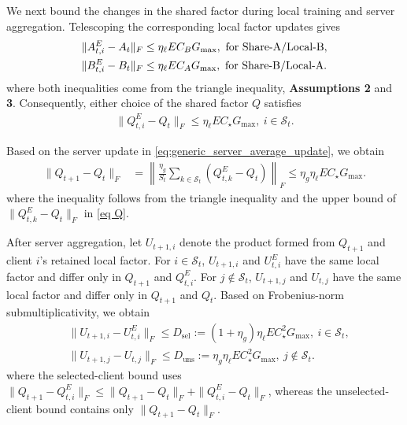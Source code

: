 \documentclass[lettersize,journal]{IEEEtran}
\begin{document}
	We next bound the changes in the shared factor during local training and server aggregation.
	Telescoping the corresponding local factor updates gives
	\begin{align}
		\|A_{t,i}^{E}-A_t\|_F
		&\le \eta_{\ell}EC_BG_{\max},
		\ \text{for Share-A/Local-B},
		\notag\\
		\|B_{t,i}^{E}-B_t\|_F
		&\le \eta_{\ell}EC_AG_{\max},
		\ \text{for Share-B/Local-A}.
	\end{align}
	where both inequalities come from the triangle inequality,
	\textbf{Assumptions 2} and \textbf{3}. Consequently, either choice of the
	shared factor $Q$ satisfies
	\begin{align} \label{eq Q}
		\|Q_{t,i}^{E}-Q_t\|_F
		\le
		\eta_{\ell}EC_\star G_{\max},
		\ i\in\mathcal{S}_t.
	\end{align}
	
	Based on the server update in
	\eqref{eq:generic_server_average_update}, we obtain
	\begin{align}
		\|Q_{t+1}\!-\!Q_t\|_F
		&\!=\!
		\left\|
		\frac{\eta_g}{S_t}\!
		\sum_{k\in\mathcal{S}_t}\!(Q_{t,k}^{E}\!-\!Q_t)\!
		\right\|_F
		\!\!\leq\!\! \eta_g\eta_{\ell}EC_\star G_{\max}.
	\end{align}
	where the inequality follows from the triangle inequality and the
	upper bound of $\|Q_{t,k}^{E}-Q_t\|_F$ in \eqref{eq Q}.
	
	After server aggregation, let $U_{t+1,i}$ denote the product formed from $Q_{t+1}$ and client $i$'s retained local factor. For $i\in\mathcal{S}_t$, $U_{t+1,i}$ and $U_{t,i}^{E}$ have the same local factor and differ only in $Q_{t+1}$ and $Q_{t,i}^{E}$. For $j\notin\mathcal{S}_t$, $U_{t+1,j}$ and $U_{t,j}$ have the same local factor and differ only in $Q_{t+1}$ and $Q_t$. Based on Frobenius-norm submultiplicativity, we obtain
	\begin{align}
		&\|U_{t+1,i}\!-\!U_{t,i}^{E}\|_F
		\!\le\!
		D_{\mathrm{sel}}
		:=\!(1\!+\!\eta_g)\eta_{\ell}EC_\star^{2}G_{\max},\ i\in\mathcal{S}_t,
		\label{eq:selected_sync_change}\\
		&\|U_{t+1,j}\!-\!U_{t,j}\|_F
		\!\le\!
		D_{\mathrm{uns}}
		:=\!
		\eta_g\eta_{\ell}EC_\star^{2}G_{\max},\ j\notin\mathcal{S}_t.
		\label{eq:unselected_product_change}
	\end{align}
	where the selected-client bound uses
	$\|Q_{t+1}-Q_{t,i}^{E}\|_F
	\le\|Q_{t+1}-Q_t\|_F+\|Q_{t,i}^{E}-Q_t\|_F$,
	whereas the unselected-client bound contains only
	$\|Q_{t+1}-Q_t\|_F$. 
	
\end{document}
